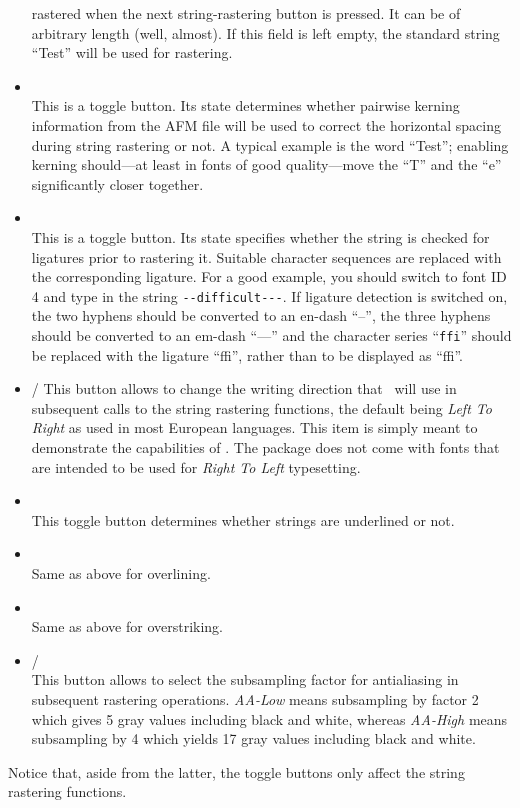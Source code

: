 \begin{itemize}
  rastered when the next string-rastering button is pressed. It can be
  of arbitrary length (well, almost). If this field is left empty, the
  standard string ``Test'' will be used for rastering.
\item {}\\
  This is a toggle button. Its state determines whether pairwise
  kerning information from the AFM file will be used to correct the
  horizontal spacing during string rastering or not. A typical example
  is the word ``Test''; enabling kerning should---at least in
  fonts of good quality---move the ``T'' and the ``e'' significantly
  closer together.
\item {}\\
  This is a toggle button. Its state specifies whether the
  string is checked for ligatures prior to rastering it. 
  Suitable character sequences are replaced with the corresponding
  ligature. For a good example, you should switch to
  font ID 4 and type in the string \verb+--difficult---+. If ligature
  detection is switched on, the two hyphens should be converted to an
  en-dash ``--'', the three hyphens should be converted to an em-dash
  ``---'' and the character series ``\verb+ffi+'' should be replaced
  with the ligature ``ffi'', rather than to be displayed as ``f{}f{}i''.
\item \fbox{$|\longrightarrow$} / \fbox{$\longleftarrow|$}  This button allows
  to change the writing direction that \tonelib\ will use in subsequent calls
  to the string rastering functions, the default being {\em Left To Right} as
  used in most European languages. This item is simply meant to demonstrate the
  capabilities of \tonelib. The package does not come with fonts that are
  intended to be used for {\em Right To Left} typesetting.
\item {}\\
  This toggle button determines whether strings are underlined or not. 
\item {}\\
  Same as above for overlining.
\item {}\\
  Same as above for overstriking.
\item {}/\\
  This button allows to select the subsampling factor for antialiasing in
  subsequent rastering operations. {\em AA-Low} means subsampling by factor 2
  which gives 5 gray values including black and white, whereas {\em AA-High}
  means subsampling by 4 which yields 17 gray values including black and
  white.  
\end{itemize}
Notice that, aside from the latter, the toggle buttons only affect the string
rastering functions.  

